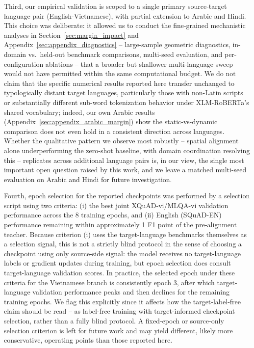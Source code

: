 \documentclass[11pt]{article}
\begin{document}
Third, our empirical validation is scoped to a single primary source-target language pair (English-Vietnamese), with partial extension to Arabic and Hindi. This choice was deliberate: it allowed us to conduct the fine-grained mechanistic analyses in Section~\ref{sec:margin_impact} and Appendix~\ref{sec:appendix_diagnostics} -- large-sample geometric diagnostics, in-domain vs.\ held-out benchmark comparisons, multi-seed evaluation, and per-configuration ablations -- that a broader but shallower multi-language sweep would not have permitted within the same computational budget. We do not claim that the specific numerical results reported here transfer unchanged to typologically distant target languages, particularly those with non-Latin scripts or substantially different sub-word tokenization behavior under XLM-RoBERTa's shared vocabulary; indeed, our own Arabic results (Appendix~\ref{sec:appendix_arabic_margin}) show the static-vs-dynamic comparison does not even hold in a consistent direction across languages. Whether the qualitative pattern we observe most robustly -- spatial alignment alone underperforming the zero-shot baseline, with domain coordination resolving this -- replicates across additional language pairs is, in our view, the single most important open question raised by this work, and we leave a matched multi-seed evaluation on Arabic and Hindi for future investigation.

Fourth, epoch selection for the reported checkpoints was performed by a selection script using two criteria: (i) the best joint XQuAD-vi/MLQA-vi validation performance across the 8 training epochs, and (ii) English (SQuAD-EN) performance remaining within approximately 1 F1 point of the pre-alignment teacher. Because criterion (i) uses the target-language benchmarks themselves as a selection signal, this is not a strictly blind protocol in the sense of choosing a checkpoint using only source-side signal: the model receives no target-language labels or gradient updates during training, but epoch selection does consult target-language validation scores. In practice, the selected epoch under these criteria for the Vietnamese branch is consistently epoch 3, after which target-language validation performance peaks and then declines for the remaining training epochs. We flag this explicitly since it affects how the target-label-free claim should be read -- as label-free training with target-informed checkpoint selection, rather than a fully blind protocol. A fixed-epoch or source-only selection criterion is left for future work and may yield different, likely more conservative, operating points than those reported here.
\end{document}

